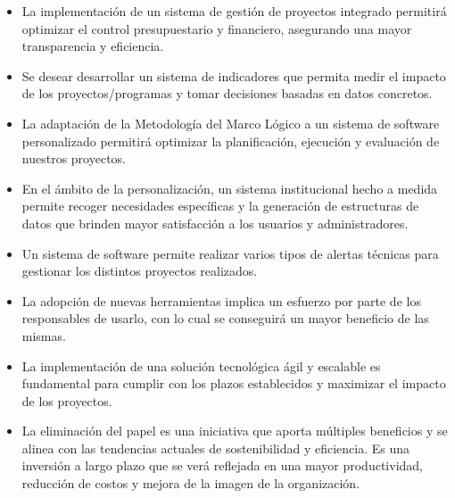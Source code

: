 \begin{itemize}
    \item La implementación de un sistema de gestión de proyectos integrado permitirá optimizar el control presupuestario y financiero, asegurando una mayor transparencia y eficiencia.
    \item Se desear desarrollar un sistema de indicadores que permita medir el impacto de los proyectos/programas y tomar decisiones basadas en datos concretos.
    \item La adaptación de la Metodología del Marco Lógico a un sistema de software personalizado permitirá optimizar la planificación, ejecución y evaluación de nuestros proyectos.
    \item En el ámbito de la personalización, un sistema institucional hecho a medida permite recoger necesidades específicas y la generación de estructuras de datos que brinden mayor satisfacción a los usuarios y administradores.
    \item Un sistema de software permite realizar varios tipos de alertas técnicas para gestionar los distintos proyectos realizados.
    \item La adopción de nuevas herramientas implica un esfuerzo por parte de los responsables de usarlo, con lo cual se conseguirá un mayor beneficio de las mismas.
    \item La implementación de una solución tecnológica ágil y escalable es fundamental para cumplir con los plazos establecidos y maximizar el impacto de los proyectos.
    \item La eliminación del papel es una iniciativa que aporta múltiples beneficios y se alinea con las tendencias actuales de sostenibilidad y eficiencia. Es una inversión a largo plazo que se verá reflejada en una mayor productividad, reducción de costos y mejora de la imagen de la organización.
\end{itemize}